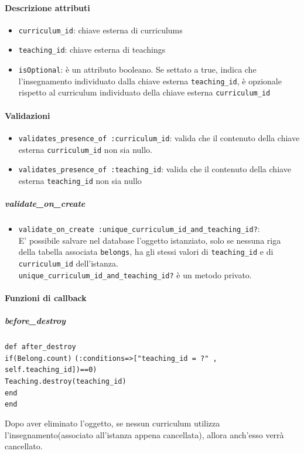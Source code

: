 \documentclass[11pt,a4paper]{article}
\begin{document}
\paragraph{Descrizione attributi}
\begin{itemize}
 \item \verb|curriculum_id|: chiave esterna di curriculums
 \item \verb|teaching_id|: chiave esterna di teachings
 \item \verb|isOptional|: è un attributo booleano. Se settato a true, indica che l'insegnamento individuato dalla chiave esterna \verb|teaching_id|, è opzionale rispetto al curriculum individuato della chiave esterna \verb|curriculum_id|	
\end{itemize}
\paragraph{Validazioni}
\begin{itemize}
 \item \verb|validates_presence_of :curriculum_id|: valida che il contenuto della chiave esterna \verb|curriculum_id| non sia nullo. 
 \item \verb|validates_presence_of :teaching_id|: valida che il contenuto della chiave esterna \verb|teaching_id| non sia nullo
\end{itemize}
\subparagraph{validate\_on\_create}
\begin{itemize}
 \item \verb|validate_on_create :unique_curriculum_id_and_teaching_id?|: \\E' possibile salvare nel database l'oggetto istanziato, solo se nessuna riga della tabella associata \verb|belongs|, ha gli stessi valori di \verb|teaching_id| e di \verb|curriculum_id| dell'istanza.\\
 \verb|unique_curriculum_id_and_teaching_id?| è un metodo privato.
\end{itemize}
\paragraph{Funzioni di callback}
\subparagraph{before\_destroy}
\begin{center}
\verb|def after_destroy|\\
    \verb|if(Belong.count)|
    \verb|(:conditions=>["teaching_id = ?" , self.teaching_id])==0)|\\
      \verb|Teaching.destroy(teaching_id)|\\
    \verb|end|\\
  \verb|end|
\end{center}
Dopo aver eliminato l'oggetto, se nessun curriculum utilizza l'insegnamento(associato all'istanza appena cancellata), allora anch'esso verrà cancellato.
\end{document}
